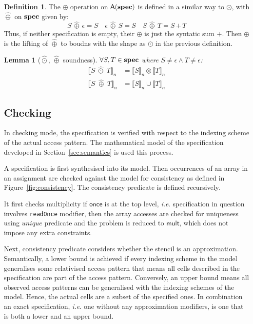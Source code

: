 \documentclass[9pt]{sigplanconf}
\newcounter{block}
\newtheorem{lemma}[block]{Lemma}
\theoremstyle{definition}
\newtheorem{definition}[block]{Definition}
\newcommand{\ie}{\emph{i.e.}}
\newcommand{\interp}[1]{\llbracket{#1}\rrbracket}
\newcommand{\term}[1]{\texttt{#1}}
\begin{document}
\begin{definition}The $\oplus$ operation on $\textsf{A}(\textbf{spec})$ 
is defined in a similar way to $\odot$, with $\hat{\oplus}$ on
$\textbf{spec}$ given by:
\begin{equation*}
S \,\hat{\oplus}\, \epsilon = S \quad
\epsilon \,\hat{\oplus}\, S = S \quad
S \, \hat{\oplus} \, T = S \, \term{+} \, T
\end{equation*}
Thus, if neither specification is empty, their $\oplus$ is just
the syntatic sum $\term{+}$. Then $\oplus$ is the lifting of
$\hat{\oplus}$ to boudns with the shape as $\odot$ in the previous
definition.
\end{definition}

\begin{lemma}[$\hat{\odot}$, $\hat{\oplus}$ soundness] $\forall S,
  T \in \textbf{spec}$ where $S \neq \epsilon \wedge T \neq \epsilon$:
\begin{align*}
\interp{S \; \hat{\odot} \; T}_n & = \interp{S}_n \otimes \interp{T}_n
  \\
\interp{S \; \hat{\oplus} \; T}_n & = \interp{S}_n \cup \interp{T}_n
\end{align*}
\label{lem:alg-soundness}
\end{lemma}
%


\subsection{Checking\label{subsec:checking}}

In checking mode, the specification is verified with respect to the indexing
scheme of the actual access pattern. The mathematical model of the specification
developed in Section~\ref{sec:semantics} is used this process.

A specification is first synthesised into its model. Then occurrences of an
array in an assignment are checked against the model for consistency as defined
in Figure~\ref{fig:consistency}. The consistency predicate is defined
recursively.

It first checks multiplicity if $\textsf{once}$ is at the top
level, \ie{} specification in question involves \texttt{readOnce} modifier, then
the array accesses are checked for uniqueness using $unique$ predicate and the
problem is reduced to $\textsf{mult}$, which does not impose any extra
constraints.

Next, consistency predicate considers whether the stencil is an approximation.
Semantically, a lower bound is achieved if every indexing scheme in the
model generalises some relativised access pattern that means all cells
described in the specification are part of the access pattern. Conversely,
an upper bound means all observed access patterns can be generalised with
the indexing schemes of the model. Hence, the actual cells are a subset of the
specified ones. In combination an exact specification, \ie{} one without any
approximation modifiers, is one that is both a lower and an upper bound.
\end{document}
